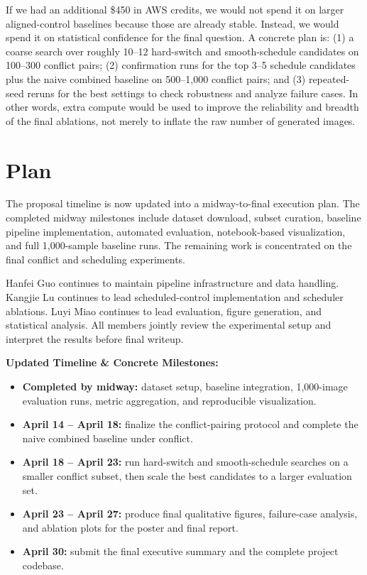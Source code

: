 \documentclass[twocolumn,11pt]{article}
\begin{document}
If we had an additional \$450 in AWS credits, we would not spend it on larger aligned-control baselines because those are already stable. Instead, we would spend it on statistical confidence for the final question. A concrete plan is: (1) a coarse search over roughly 10--12 hard-switch and smooth-schedule candidates on 100--300 conflict pairs; (2) confirmation runs for the top 3--5 schedule candidates plus the naive combined baseline on 500--1{,}000 conflict pairs; and (3) repeated-seed reruns for the best settings to check robustness and analyze failure cases. In other words, extra compute would be used to improve the reliability and breadth of the final ablations, not merely to inflate the raw number of generated images.

\section{Plan}
The proposal timeline is now updated into a midway-to-final execution plan. The completed midway milestones include dataset download, subset curation, baseline pipeline implementation, automated evaluation, notebook-based visualization, and full 1{,}000-sample baseline runs. The remaining work is concentrated on the final conflict and scheduling experiments.

Hanfei Guo continues to maintain pipeline infrastructure and data handling. Kangjie Lu continues to lead scheduled-control implementation and scheduler ablations. Luyi Miao continues to lead evaluation, figure generation, and statistical analysis. All members jointly review the experimental setup and interpret the results before final writeup.

\textbf{Updated Timeline \& Concrete Milestones:}

\begin{itemize}
    \item \textbf{Completed by midway:} dataset setup, baseline integration, 1{,}000-image evaluation runs, metric aggregation, and reproducible visualization.
    \item \textbf{April 14 -- April 18:} finalize the conflict-pairing protocol and complete the naive combined baseline under conflict.
    \item \textbf{April 18 -- April 23:} run hard-switch and smooth-schedule searches on a smaller conflict subset, then scale the best candidates to a larger evaluation set.
    \item \textbf{April 23 -- April 27:} produce final qualitative figures, failure-case analysis, and ablation plots for the poster and final report.
    \item \textbf{April 30:} submit the final executive summary and the complete project codebase.
\end{itemize}




\end{document}
